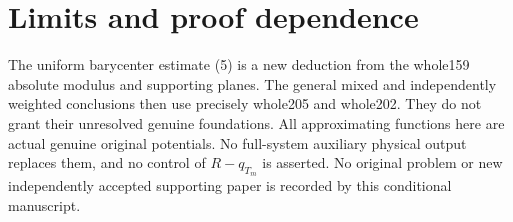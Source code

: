 \documentclass[11pt]{article}
\begin{document}
\section{Limits and proof dependence}
The uniform barycenter estimate (5) is a new deduction
from the whole159 absolute modulus and supporting planes.
The general mixed and independently weighted conclusions
then use precisely whole205 and whole202. They do not
grant their unresolved genuine foundations.
All approximating functions here are actual genuine
original potentials. No full-system auxiliary physical
output replaces them, and no control of $R-q_{T_m}$ is
asserted. No original problem or new independently
accepted supporting paper is recorded by this conditional
manuscript.
\end{document}
